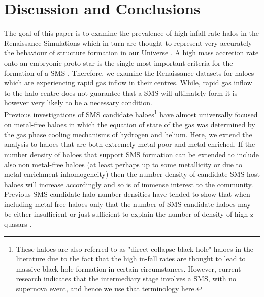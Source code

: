 \documentclass[graphics, twocolumn, usenatbib]{mn2e}
\begin{document}
\section{Discussion and Conclusions} \label{Sec:Discussion}
The goal of this paper is to examine the prevalence of high infall rate halos in the
Renaissance Simulations which in turn are thought to represent very accurately the
behaviour of structure formation in our Universe \citep{Chen_2014, Xu_2013, Xu_2014, OShea_2015,
  Barrow_2017, Wise_2019}. A high mass accretion rate onto an embryonic proto-star is the
single most important criteria for the formation of a SMS \citep{Hosokawa_2013, Sakurai_2016,
  Woods_2018}. Therefore, we examine the Renaissance datasets for haloes which are experiencing
rapid gas inflow in their centres. While, rapid gas inflow to the halo centre does not guarantee
that a SMS will ultimately form it is however very likely to be a necessary condition. \\
\indent Previous investigations of SMS candidate haloes\footnote{These haloes are also
  referred to as "direct collapse black hole" haloes in the literature due to the fact
  that the high in-fall rates are thought to lead to massive black hole formation in certain
  circumstances. However, current research indicates that the intermediary stage involves a
  SMS, with no supernova event, and hence we use that terminology here.} have almost
universally focused on
metal-free haloes in which the equation of state of the gas was determined by the gas phase
cooling mechanisms of hydrogen and helium. Here, we extend the analysis to haloes that are both
extremely metal-poor and metal-enriched. If the number density of haloes that support SMS formation
can be extended to include also non metal-free haloes (at least perhaps up to some
metallicity or due to metal enrichment inhomogeneity) then the
number density of candidate SMS host haloes will increase accordingly and so is of
immense interest to the community. Previous SMS candidate halo number densities have
tended to show that when including metal-free haloes only that the number of SMS candidate
haloes may be either insufficient or just sufficient to explain the number of density of
high-z quasars \citep{Agarwal_2012, Visbal_2014b, Agarwal_2015b, Latif_2014a,
  Valiante_2016, Habouzit_2016, Valiante_2017, Habouzit_2017, Regan_2017}. \\
\end{document}
